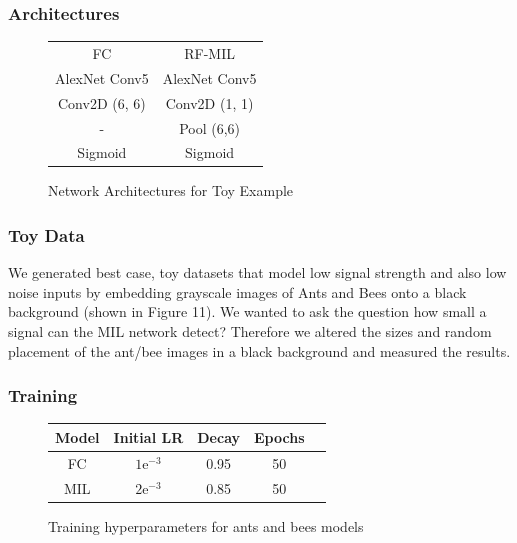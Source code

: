 \documentclass[twocolumn,10pt]{article}
\begin{document}
\subsubsection{Architectures}

\begin{figure}[H]
  \label{fig:ab_architecture}
  \begin{center}
    \begin{tabular}{ | c |c|}
    \hline
     FC & RF-MIL\\
     \hhline{|=|=|}
    AlexNet Conv5 & AlexNet Conv5 \\
    \hline
    {Conv2D  (6, 6)} & Conv2D (1, 1) \\
    \hline
    - & Pool (6,6) \\
    \hline
    Sigmoid & Sigmoid \\
    \hline
    \end{tabular}   
  \end{center}
  \caption{Network Architectures for Toy Example}
\end{figure}

\subsubsection{Toy Data}
We generated best case, toy datasets that model low signal strength
and also low noise inputs by embedding grayscale images of Ants and Bees onto a
black background (shown in Figure 11). We wanted to ask the question how small a signal can the MIL network detect? Therefore we altered the sizes and random placement of the ant/bee images in a black background and measured the results. 

\subsubsection{Training}
\begin{figure}[H]
\label{ab_training}
\begin{center}
\newcommand{\e}{\mbox{e}}
\begin{tabular}{|c|c|c|c|c|}
\hline 
Model  & Initial LR& Decay& Epochs \\
\hline
FC  &  $1\e^{-3}$ & 0.95 & 50 \\
MIL  & $2\e^{-3}$ & 0.85 & 50 \\
\hline
\end{tabular}
\end{center}
\caption{Training hyperparameters for ants and bees models}
\end{figure}
\end{document}
